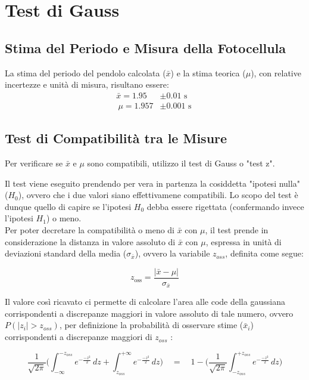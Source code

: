 \documentclass{article}
\begin{document}
\section{Test di Gauss}
\subsection{Stima del Periodo e Misura della Fotocellula}

La stima del periodo del pendolo calcolata ($\bar{x}$) e la stima teorica ($\mu$), con relative incertezze e unità di misura, risultano essere:
\begin{align*}
	\bar{x} = 1.95 &\pm 0.01\text{ s}\\ \
	\mu      = 1.957 &\pm 0.001 \text{ s} \
\end{align*}

\subsection{Test di Compatibilità tra le Misure}
Per verificare se $\bar{x}$ e $\mu$ sono compatibili, utilizzo il test di Gauss o "test z".

Il test viene eseguito prendendo per vera in partenza la cosiddetta "ipotesi nulla" ($H_0$), ovvero che i due valori siano effettivamene compatibili. Lo scopo del test è dunque quello di capire se l'ipotesi $H_0$ debba essere rigettata (confermando invece l'ipotesi $H_1$) o meno. \\

Per poter decretare la compatibilità o meno di $\bar{x}$ con $\mu$, il test prende in considerazione la distanza in valore assoluto di $\bar{x}$ con $\mu$, espressa in unità di deviazioni standard della media ($\sigma_{\bar{x}}$), ovvero la variabile $z_{oss}$, definita come segue: 

\[ z_{\text{oss}} = \frac{| \bar{x} - \mu |}{\sigma_{\bar{x}}} \]
\vspace{0.1 cm}

\noindent Il valore così ricavato ci permette di calcolare l'area alle code della gaussiana corrispondenti a discrepanze maggiori in valore assoluto di tale numero, ovvero $P( | z_i |> z_{oss} )$, per definizione la probabilità di osservare stime ($\bar{x}_i$) corrispondenti a discrepanze maggiori di $z_{oss}$ :
\vspace{0.2cm}

\[ \frac{1}{\sqrt{2\pi}} \bigg( \int_{-\infty}^{- z_{oss}}e^{-\frac{-z^2}{2}} \,dz +  \int_{z_{oss}}^{+ \infty}e^{-\frac{-z^2}{2}} \,dz \bigg)  \quad = \quad 1 - \bigg( \frac{1}{\sqrt{2\pi}} \int_{-z_{oss}}^{+ z_{oss}}e^{-\frac{-z^2}{2}} \,dz \bigg) \]
\vspace{0.2cm}
\end{document}
